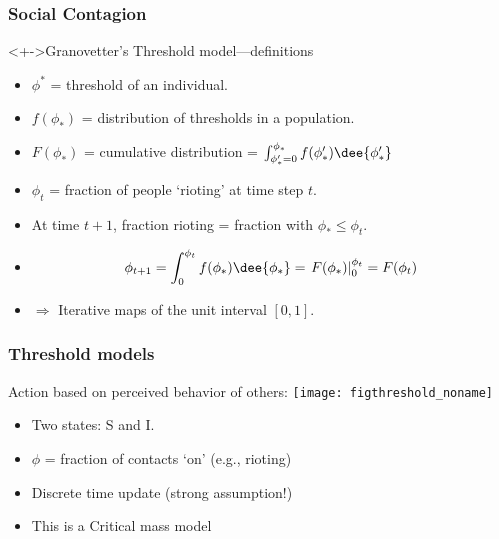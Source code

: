 \begin{frame}
  \frametitle{Social Contagion}
  
  \begin{block}<+->{Granovetter's Threshold model---definitions}
    \begin{itemize}
    \item<+-> $\phi^\ast$ = threshold of an individual.
    \item<+-> $f(\phi_\ast)$ = distribution of thresholds in a population.
    \item<+-> $F(\phi_\ast)$ = cumulative distribution = 
      $\int_{\phi_\ast'=0}^{\phi_\ast} f(\phi_\ast') \dee{\phi_\ast'}$
    \item<+-> $\phi_t$ = fraction of people `rioting' at time step $t$.
    \end{itemize}
  \end{block}
  
  \begin{block}{}
    \begin{itemize}
    \item<+->
      At time $t+1$, fraction rioting
      = fraction with $\phi_\ast \le \phi_t$.
    \item<+->
      \[ \phi_{t+1} = \int_{0}^{\phi_t} f(\phi_\ast) \dee{\phi_\ast}
      = \left. F(\phi_\ast) \right|_{0}^{\phi_t} = F(\phi_t) \]
    \item<+->
      $\Rightarrow$ Iterative maps of the unit interval $[0, 1]$.
    \end{itemize}
   \end{block}

\end{frame}

\begin{frame}
  \frametitle{Threshold models}

  \begin{block}{Action based on perceived behavior of others:}
    \texttt{[image: figthreshold\_noname]}
    \begin{itemize}
    \item<1-> Two states: S and I.
    \item<1-> $\phi$ = fraction of contacts `on' (e.g., rioting)
    \item<2-> Discrete time update (strong assumption!)
    \item<3-> This is a \alert{Critical mass model}
  \end{itemize}
  \end{block}

\end{frame}


